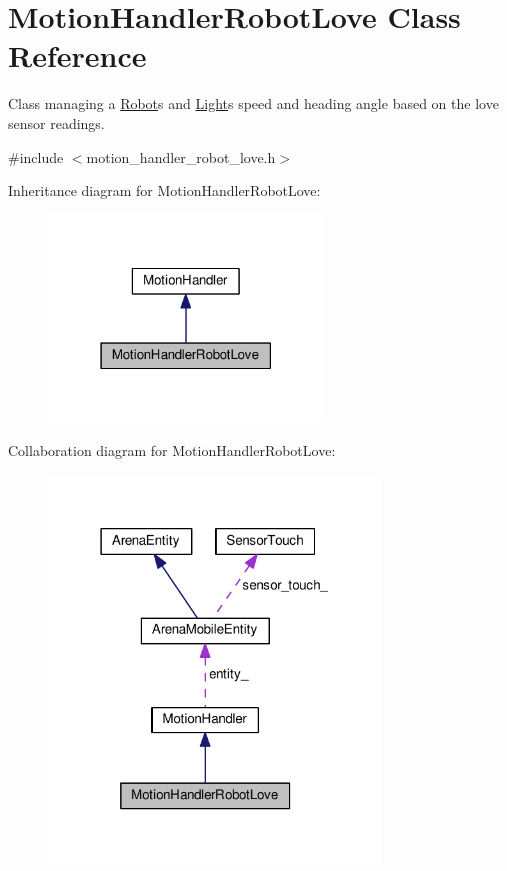 \hypertarget{classMotionHandlerRobotLove}{}\section{Motion\+Handler\+Robot\+Love Class Reference}
\label{classMotionHandlerRobotLove}


Class managing a \hyperlink{classRobot}{Robot}\textquotesingle{}s and \hyperlink{classLight}{Light}\textquotesingle{}s speed and heading angle based on the love sensor readings.  




{\ttfamily \#include $<$motion\+\_\+handler\+\_\+robot\+\_\+love.\+h$>$}



Inheritance diagram for Motion\+Handler\+Robot\+Love\+:\nopagebreak
\begin{figure}[H]
\begin{center}
\leavevmode
\includegraphics[width=207pt]{classMotionHandlerRobotLove__inherit__graph}
\end{center}
\end{figure}


Collaboration diagram for Motion\+Handler\+Robot\+Love\+:\nopagebreak
\begin{figure}[H]
\begin{center}
\leavevmode
\includegraphics[width=250pt]{classMotionHandlerRobotLove__coll__graph}
\end{center}
\end{figure}

